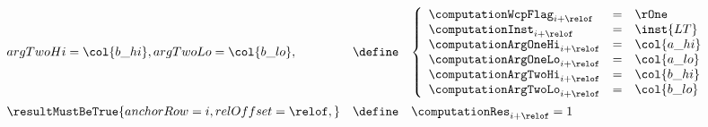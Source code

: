 \[\begin{array}{lcl}
{			argTwoHi  = \col{b\_hi} ,
			argTwoLo  = \col{b\_lo} ,
		} & \define &
		\left\{ \begin{array}{lcl}
			\computationWcpFlag  _{i + \relof} & = & \rOne       \\
			\computationInst     _{i + \relof} & = & \inst{LT}   \\
			\computationArgOneHi _{i + \relof} & = & \col{a\_hi} \\
			\computationArgOneLo _{i + \relof} & = & \col{a\_lo} \\
			\computationArgTwoHi _{i + \relof} & = & \col{b\_hi} \\
			\computationArgTwoLo _{i + \relof} & = & \col{b\_lo} \\
		\end{array} \right. \vspace{2mm} \\
		\resultMustBeTrue {
			anchorRow = i      ,
			relOffset = \relof ,
		}
		& \define &
		\computationRes _{i + \relof} = 1 \\
		\vspace{2mm} \\

\end{array}\]
